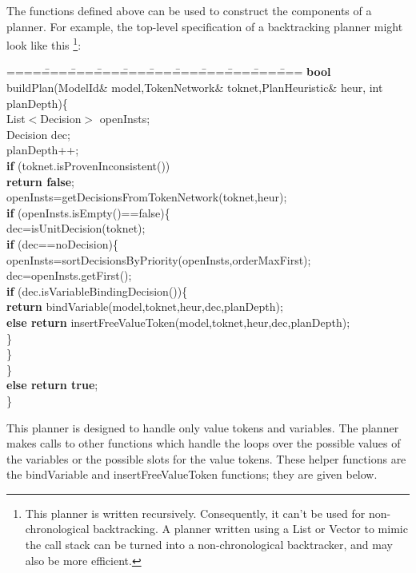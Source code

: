 The functions defined above can be used to construct the components of a planner.  For example, 
the top-level specification of a backtracking planner might look like this \footnote{This planner
is written recursively.  Consequently, it can't be used for non-chronological backtracking.
A planner written using a List or Vector to mimic the call stack can be turned into a non-chronological
backtracker, and may also be more efficient.}:
\newpage
\begin{tabbing}
====\====\====\====\====\====\====\====\====\====\====\kill
{\bf bool} buildPlan(ModelId\& model,TokenNetwork\& toknet,PlanHeuristic\& heur, int planDepth)\{\\
\> List$<$Decision$>$ openInsts;\\
\> Decision dec;\\
\> planDepth++;\\
\> {\bf if} (toknet.isProvenInconsistent()) \\
\> \> {\bf return false};\\
\> openInsts=getDecisionsFromTokenNetwork(toknet,heur);\\
\> {\bf if} (openInsts.isEmpty()==false)\{\\
\> \> dec=isUnitDecision(toknet);\\
\> \> {\bf if} (dec==noDecision)\{\\
\> \> \> openInsts=sortDecisionsByPriority(openInsts,orderMaxFirst);\\
\> \> \> dec=openInsts.getFirst();\\
\> \> \> {\bf if} (dec.isVariableBindingDecision())\{\\
\> \> \> \> {\bf return} bindVariable(model,toknet,heur,dec,planDepth);\\
\> \> \> {\bf else return} insertFreeValueToken(model,toknet,heur,dec,planDepth);\\
\> \> \> \}\\
\> \> \}\\
\> \}\\
\> {\bf else return true};\\
\}
\end{tabbing}

This planner is designed to handle only value tokens and variables.  The planner makes calls
to other functions which handle the loops over the possible values of the variables or the
possible slots for the value tokens.  These helper functions are the bindVariable
and insertFreeValueToken functions; they are given below.
\newpage


